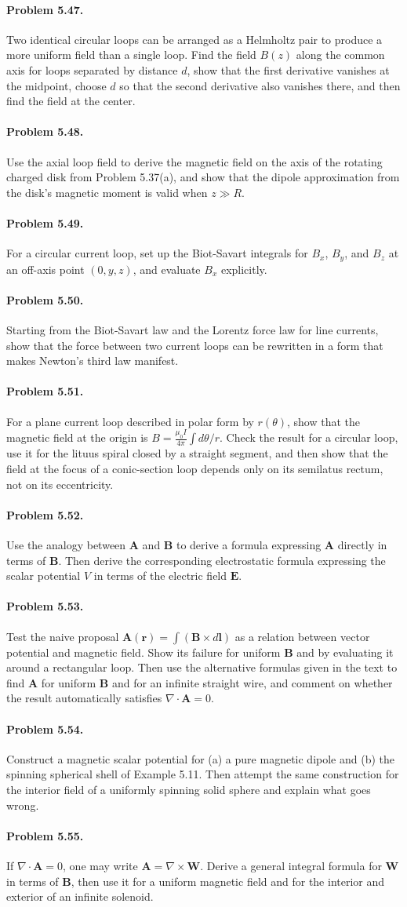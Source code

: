 \documentclass{aa}
\newcommand{\problemstatement}[2]{%
\paragraph{Problem #1.}#2\par\medskip
}
\begin{document}
\problemstatement{5.47}{Two identical circular loops can be arranged as a Helmholtz pair to produce a more uniform field than a single loop. Find the field \(B(z)\) along the common axis for loops separated by distance \(d\), show that the first derivative vanishes at the midpoint, choose \(d\) so that the second derivative also vanishes there, and then find the field at the center.}
\problemstatement{5.48}{Use the axial loop field to derive the magnetic field on the axis of the rotating charged disk from Problem 5.37(a), and show that the dipole approximation from the disk's magnetic moment is valid when \(z\gg R\).}
\problemstatement{5.49}{For a circular current loop, set up the Biot-Savart integrals for \(B_x\), \(B_y\), and \(B_z\) at an off-axis point \((0,y,z)\), and evaluate \(B_x\) explicitly.}
\problemstatement{5.50}{Starting from the Biot-Savart law and the Lorentz force law for line currents, show that the force between two current loops can be rewritten in a form that makes Newton's third law manifest.}
\problemstatement{5.51}{For a plane current loop described in polar form by \(r(\theta)\), show that the magnetic field at the origin is \(B=\frac{\mu_0 I}{4\pi}\int d\theta/r\). Check the result for a circular loop, use it for the lituus spiral closed by a straight segment, and then show that the field at the focus of a conic-section loop depends only on its semilatus rectum, not on its eccentricity.}
\problemstatement{5.52}{Use the analogy between \(\mathbf A\) and \(\mathbf B\) to derive a formula expressing \(\mathbf A\) directly in terms of \(\mathbf B\). Then derive the corresponding electrostatic formula expressing the scalar potential \(V\) in terms of the electric field \(\mathbf E\).}
\problemstatement{5.53}{Test the naive proposal \(\mathbf A(\mathbf r)=\int (\mathbf B\times d\mathbf l)\) as a relation between vector potential and magnetic field. Show its failure for uniform \(\mathbf B\) and by evaluating it around a rectangular loop. Then use the alternative formulas given in the text to find \(\mathbf A\) for uniform \(\mathbf B\) and for an infinite straight wire, and comment on whether the result automatically satisfies \(\nabla\cdot\mathbf A=0\).}
\problemstatement{5.54}{Construct a magnetic scalar potential for (a) a pure magnetic dipole and (b) the spinning spherical shell of Example 5.11. Then attempt the same construction for the interior field of a uniformly spinning solid sphere and explain what goes wrong.}
\problemstatement{5.55}{If \(\nabla\cdot\mathbf A=0\), one may write \(\mathbf A=\nabla\times\mathbf W\). Derive a general integral formula for \(\mathbf W\) in terms of \(\mathbf B\), then use it for a uniform magnetic field and for the interior and exterior of an infinite solenoid.}
\end{document}
